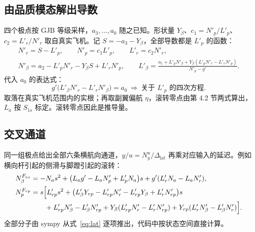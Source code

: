 \documentclass[UTF8,a4paper,11pt,fontset=fandol,scheme=plain]{ctexart}
\begin{document}
\subsection{由品质模态解出导数}
四个极点按 GJB 等级采样，\(a_3,\dots,a_0\) 随之已知。形状量 \(Y_\beta\)、\(c_1=N'_p/L'_p\)、\(c_2=L'_r/N'_r\) 取自真实飞机。记 \(S=-a_3-Y_\beta\)，全部导数都是 \(L'_p\) 的函数：
\begin{equation}
\begin{gathered}
N'_r=S-L'_p,\qquad N'_p=c_1L'_p,\qquad L'_r=c_2N'_r,\\
N'_\beta=a_2-L'_pN'_r-Y_\beta S+L'_rN'_p,\qquad L'_\beta=\frac{a_1+L'_pN'_\beta+Y_\beta(L'_pN'_r-L'_rN'_p)}{N'_p-g'} .
\end{gathered}
\end{equation}
代入 \(a_0\) 的表达式：
\begin{equation}
g'\bigl(L'_\beta N'_r-L'_rN'_\beta\bigr)=a_0\ \Longrightarrow\ \text{关于 } L'_p \text{ 的四次方程}.
\end{equation}
取落在真实飞机范围内的实根；再取副翼偏航 \(\eta\)，滚转零点由第 4.2 节两式算出，\(L_a\) 按 \(S_{1s}\) 标定。滚转零点因此是推导量。

\subsection{交叉通道}
同一组极点给出全部六条横航向通道，\(y/u=N^u_y/\Delta_{\mathrm{lat}}\) 再乘对应输入的延迟。例如横向杆引起的侧滑与脚蹬引起的滚转：
\begin{equation}
\begin{aligned}
N^{F_{as}}_\beta&=-N_as^2+\bigl(L_ag'-L_aN'_p+L'_pN_a\bigr)s+g'(L'_rN_a-L_aN'_r),\\
N^{F_{rp}}_p&=s\Bigl[L'_{rp}s^2+\bigl(L'_\beta Y_{rp}-L'_{rp}N'_r-L'_{rp}Y_\beta+L'_rN'_{rp}\bigr)s\\
&\qquad+L'_{rp}N'_\beta-L'_\beta N'_{rp}+Y_\beta(L'_{rp}N'_r-L'_rN'_{rp})+Y_{rp}(L'_rN'_\beta-L'_\beta N'_r)\Bigr].
\end{aligned}
\end{equation}
全部分子由 sympy 从式~\eqref{eq:lat} 逐项推出，代码中按状态空间直接计算。
\end{document}
